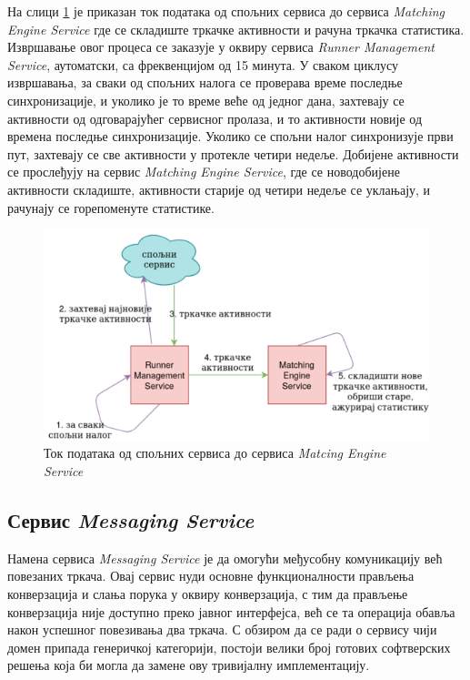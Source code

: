 \documentclass[12pt,oneside]{memoir}
\begin{document}
На слици \ref{fig:spoljni_servis_tok_podataka} је приказан ток података од спољних сервиса до сервиса \textit{Matching Engine Service} где се складиште тркачке активности и рачуна тркачка статистика. Извршавање овог процеса се заказује у оквиру сервиса \textit{Runner Management Service}, аутоматски, са фреквенцијом од 15 минута. У сваком циклусу извршавања, за сваки од спољних налога се проверава време последње синхронизације, и уколико је то време веће од једног дана, захтевају се активности од одговарајућег сервисног пролаза, и то активности новије од времена последње синхронизације. Уколико се спољни налог синхронизује први пут, захтевају се све активности у протекле четири недеље. Добијене активности се прослеђују на сервис \textit{Matching Engine Service}, где се новодобијене активности складиште, активности старије од четири недеље се уклањају, и рачунају се горепоменуте статистике.

\begin{figure}[!ht]
  \centering
  \includegraphics[scale=0.7]{slike/spoljni-servis-tok-podataka.png}
  \caption{Ток података од спољних сервиса до сервиса \textit{Matcing Engine Service}}
  \label{fig:spoljni_servis_tok_podataka}
\end{figure}

\subsection{Сервис \textit{Messaging Service}}
Намена сервиса \textit{Messaging Service} је да омогући међусобну комуникацију већ повезаних тркача. Овај сервис нуди основне функционалности прављења конверзација и слања порука у оквиру конверзација, с тим да прављење конверзација није доступно преко јавног интерфејса, већ се та операција обавља након успешног повезивања два тркача. С обзиром да се ради о сервису чији домен припада генеричкој категорији, постоји велики број готових софтверских решења која би могла да замене ову тривијалну имплементацију.
\end{document}
